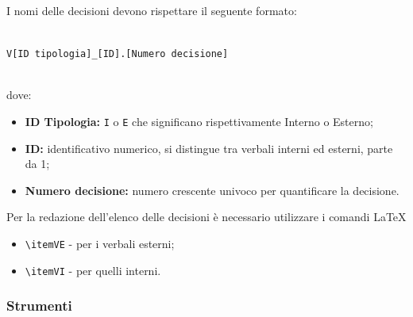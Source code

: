 	        I nomi delle decisioni devono rispettare il seguente formato:\\\\
            \centerline{\texttt{V[ID tipologia]\_[ID].[Numero decisione]}}\\
            dove:
            \begin{itemize}
            	\item \textbf{ID Tipologia:} \texttt{I} o \texttt{E} che significano rispettivamente Interno o Esterno;
            	 \item \textbf{ID:} identificativo numerico, si distingue tra verbali interni ed esterni, parte da 1;
            	 \item \textbf{Numero decisione:} numero crescente univoco per quantificare la decisione.
            \end{itemize}
			Per la redazione dell'elenco delle decisioni è necessario utilizzare i comandi \LaTeX
			\begin{itemize}
				\item \texttt{\textbackslash itemVE} - per i verbali esterni;
				\item \texttt{\textbackslash itemVI}  - per quelli interni.
			\end{itemize}
		
		\subsubsection{Strumenti}
